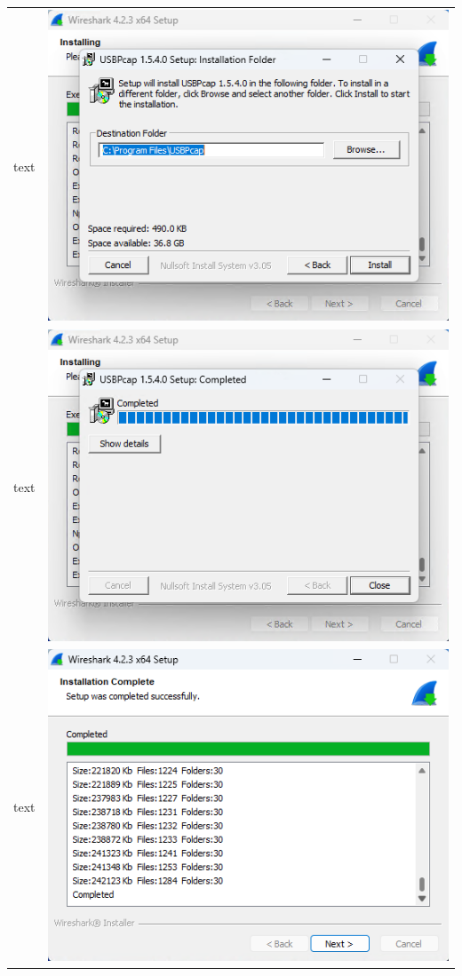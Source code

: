 \documentclass[11pt,a4paper]{report}
\begin{document}
\begin{tabular}{ l r }
            text & \includegraphics[scale=1.0]{wireshark18} \\
            text & \includegraphics[scale=1.0]{wireshark19} \\
            text & \includegraphics[scale=1.0]{wireshark20} \\

\end{tabular}
\end{document}
